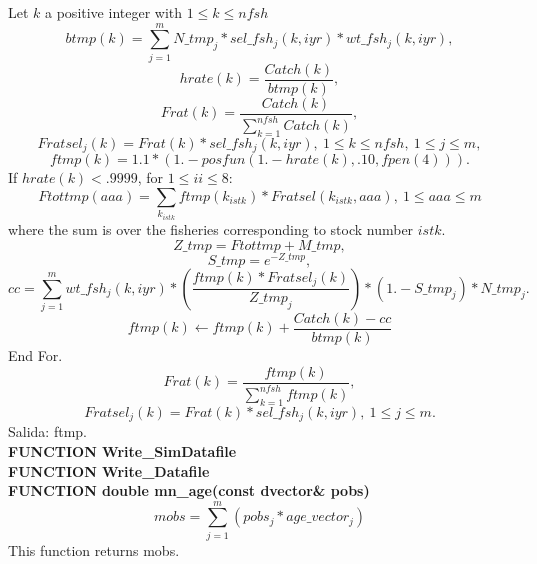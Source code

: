 \documentclass{article}
\begin{document}
Let $k$ a positive integer with $1\leq k \leq nfsh$
\begin{equation}
    btmp(k)  =  \sum_{j=1}^mN\_tmp_j * sel\_fsh_j(k,iyr) * wt\_fsh_j(k,iyr),
\end{equation}
\begin{equation}
    hrate(k) = \dfrac{Catch(k)}{btmp(k)},
\end{equation}
\begin{equation}
    Frat(k)  = \dfrac{Catch(k)}{\sum_{k=1}^{nfsh} Catch(k)},
\end{equation}
\begin{equation}
    Fratsel_j(k) = Frat(k)*sel\_fsh_j(k,iyr), \ 1\leq k \leq nfsh, \ 1\leq j \leq m,
\end{equation}
\begin{equation}
    ftmp(k) = 1.1*(1.- posfun(1.-hrate(k),.10,fpen(4))).
\end{equation}
If $hrate(k)<.9999$, for $1\leq ii \leq 8$:
\begin{equation}
    Ftottmp(aaa)=\sum_{k_{istk}}ftmp(k_{istk})*Fratsel(k_{istk},aaa), \ 1\leq aaa \leq m
\end{equation}
where the sum is over the fisheries corresponding to stock number $istk$.
\begin{equation}
    Z\_tmp     = Ftottmp  + M\_tmp,
\end{equation}
\begin{equation}
    S\_tmp     = e^{ -Z\_tmp },
\end{equation}
\begin{equation}
    cc = \sum_{j=1}^mwt\_fsh_j(k,iyr) * \left(\dfrac{ftmp(k)*Fratsel_j(k)}{  Z\_tmp_j}\right)*(1.-S\_tmp_j)*N\_tmp_j.
\end{equation}
\begin{equation}
    ftmp(k) \leftarrow ftmp(k) + \dfrac{Catch(k)-cc}{btmp(k)}
\end{equation}
End For.
\begin{equation}
    Frat(k)=\dfrac{ftmp(k)}{\sum_{k=1}^{nfsh}ftmp(k)},
\end{equation}
\begin{equation}
    Fratsel_j(k)=Frat(k)*sel\_fsh_j(k,iyr), \ 1\leq j \leq m.
\end{equation}
Salida: ftmp.\\

\textbf{FUNCTION Write\_SimDatafile}\\
\textbf{FUNCTION Write\_Datafile}\\


\textbf{FUNCTION double mn\_age(const dvector\& pobs)}
\begin{equation}
    mobs = \sum_{j=1}^m(pobs_j*age\_vector_j)
\end{equation}
This function returns mobs.\\
\end{document}
